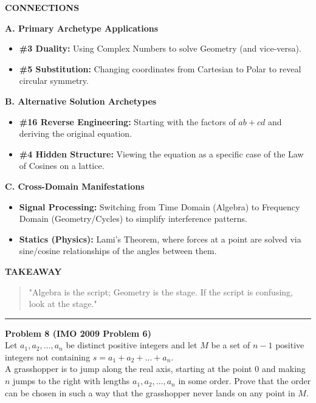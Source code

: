 \documentclass{article}
\begin{document}
\noindent \textbf{CONNECTIONS}

\noindent \textbf{A. Primary Archetype Applications}
\begin{itemize}
    \item \textbf{\#3 Duality:} Using Complex Numbers to solve Geometry (and vice-versa).
    \item \textbf{\#5 Substitution:} Changing coordinates from Cartesian to Polar to reveal circular symmetry.
\end{itemize}

\noindent \textbf{B. Alternative Solution Archetypes}
\begin{itemize}
    \item \textbf{\#16 Reverse Engineering:} Starting with the factors of $ab + cd$ and deriving the original equation.
    \item \textbf{\#4 Hidden Structure:} Viewing the equation as a specific case of the Law of Cosines on a lattice.
\end{itemize}

\noindent \textbf{C. Cross-Domain Manifestations}
\begin{itemize}
    \item \textbf{Signal Processing:} Switching from Time Domain (Algebra) to Frequency Domain (Geometry/Cycles) to simplify interference patterns.
    \item \textbf{Statics (Physics):} Lami's Theorem, where forces at a point are solved via sine/cosine relationships of the angles between them.
\end{itemize}

\noindent \textbf{TAKEAWAY}
\begin{quote}
    "Algebra is the script; Geometry is the stage. If the script is confusing, look at the stage."
\end{quote}

\noindent \rule{\textwidth}{0.4pt}

\noindent \textbf{Problem 8 (IMO 2009 Problem 6)} \\
Let $a_1, a_2, \ldots, a_n$ be distinct positive integers and let $M$ be a set of $n-1$ positive integers not containing $s = a_1 + a_2 + \ldots + a_n$. \\

\noindent A grasshopper is to jump along the real axis, starting at the point 0 and making $n$ jumps to the right with lengths $a_1, a_2, \ldots, a_n$ in some order. Prove that the order can be chosen in such a way that the grasshopper never lands on any point in $M$. \\
\end{document}
